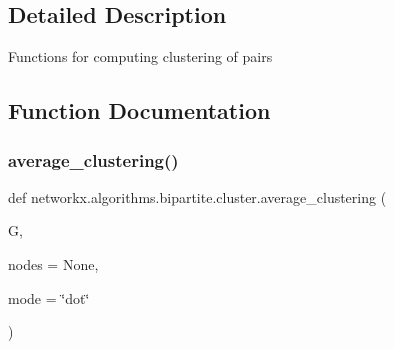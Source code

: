 \subsection{Detailed Description}
\begin{DoxyVerb}Functions for computing clustering of pairs\end{DoxyVerb}
 

\subsection{Function Documentation}
\mbox{\label{namespacenetworkx_1_1algorithms_1_1bipartite_1_1cluster_abb3b66d2c3871659c444861cc3180d65}} 
\subsubsection{\texorpdfstring{average\+\_\+clustering()}{average\_clustering()}}
{\footnotesize\ttfamily def networkx.\+algorithms.\+bipartite.\+cluster.\+average\+\_\+clustering (\begin{DoxyParamCaption}\item[{}]{G,  }\item[{}]{nodes = {\ttfamily None},  }\item[{}]{mode = {\ttfamily \char`\"{}dot\char`\"{}} }\end{DoxyParamCaption})}

